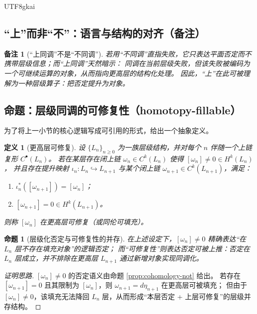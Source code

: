 \documentclass[12pt]{article}
\newtheorem{definition}{定义}[section]
\newtheorem{proposition}{命题}[section]
\newtheorem{remark}{备注}[section]
\begin{document}
\begin{CJK*}{UTF8}{gkai}
\subsection{“上”而非“不”：语言与结构的对齐（备注）}

\begin{remark}[“上同调”不是“不同调”]
若用“不同调”直指失败，它只表达平面否定而不携带层级信息；而“上同调”天然暗示：
同调在当前层级失败，但该失败被编码为一个可继续运算的对象，从而指向更高层的结构化处理。
因此，“上”在此可被理解为一种层级算子：\emph{把否定提升为对象}。
\end{remark}

\subsection{命题：层级同调的可修复性（homotopy-fillable）}

为了将上一小节的核心逻辑写成可引用的形式，给出一个抽象定义。

\begin{definition}[更高层可修复]
\label{def:fillable}
设 $\{L_n\}_{n\ge 0}$ 为一族层级结构，并对每个 $n$ 伴随一个上链复形 $C^\bullet(L_n)$。
若在某层存在闭上链 $\omega_n\in C^k(L_n)$ 使得 $[\omega_n]\neq 0\in H^k(L_n)$，
并且存在提升映射 $\iota_n\colon L_n\hookrightarrow L_{n+1}$ 与某个闭上链 $\omega_{n+1}\in C^k(L_{n+1})$，满足：
\begin{enumerate}
  \item $\iota_n^\ast([\omega_{n+1}])=[\omega_n]$；
  \item $[\omega_{n+1}]=0\in H^k(L_{n+1})$。
\end{enumerate}
则称 $[\omega_n]$ \emph{在更高层可修复}（或同伦可填充）。
\end{definition}

\begin{proposition}[层级化否定与可修复性的并存]\label{prop:fillable}
在上述设定下，$[\omega_n]\neq 0$ 精确表达“在 $L_n$ 层不存在填充对象”的逻辑否定；
而“可修复性”则表达否定可被上推：否定在 $L_n$ 层成立，并不排除在更高层 $L_{n+1}$ 通过新增对象实现同调化。
\end{proposition}

\begin{proof}[证明思路]
$[\omega_n]\neq 0$ 的否定语义由命题 \ref{prop:cohomology-not} 给出。
若存在 $[\omega_{n+1}]=0$ 且其限制为 $[\omega_n]$，则 $\omega_{n+1}=d\eta_{n+1}$ 在更高层可被填充；
但由于 $[\omega_n]\neq 0$，该填充无法降回 $L_n$ 层，从而形成“本层否定 + 上层可修复”的层级并存结构。
\end{proof}


\end{CJK*}
\end{document}
